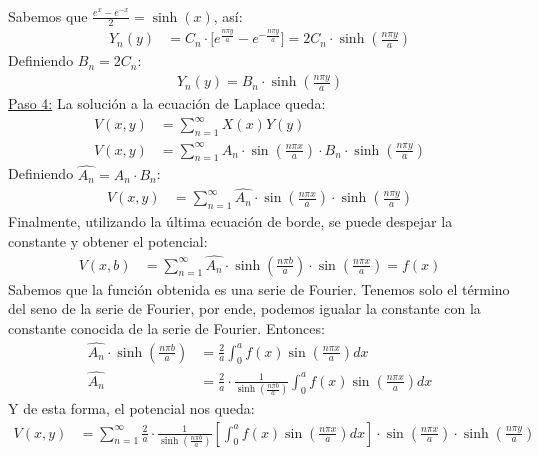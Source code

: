 \documentclass[
  11pt,
  letterpaper,
   answers
  ]{exam}
\begin{document}
\begin{questions}
\begin{solution}
\begin{parts}
\begin{align}
        \end{align}
        Sabemos que $\frac{e^{x} - e^{-x}}{2} = \sinh{(x)}$, así:
        \begin{align}
            Y_n(y) &= C_n \cdot \bigl[e^{\frac{n \pi y}{a}} - e^{-\frac{n \pi y}{a}}\bigr] = 2 C_n \cdot \sinh\!\left(\frac{n \pi y}{a}\right)
        \end{align}
        Definiendo $B_n = 2C_n$:
        \begin{align}
            Y_n(y) = B_n \cdot \sinh\!\left(\frac{n \pi y}{a}\right)
        \end{align}
    \underline{Paso 4:} La solución a la ecuación de Laplace queda:
    \begin{align}
    V(x,y) &= \sum_{n=1}^{\infty} X(x) Y(y) \\ 
    V(x,y) &= \sum_{n=1}^{\infty} A_n \cdot \sin\!\left(\frac{n \pi x}{a}\right) \cdot B_n \cdot \sinh\!\left(\frac{n \pi y}{a}\right)
    \end{align}
    Definiendo $\hat{A_n} = A_n \cdot B_n$:
    \begin{align}
    V(x,y) &= \sum_{n=1}^{\infty} \hat{A_n} \cdot \sin\!\left(\frac{n \pi x}{a}\right) \cdot \sinh\!\left(\frac{n \pi y}{a}\right)
    \end{align}
    Finalmente, utilizando la última ecuación de borde, se puede despejar la constante y obtener el potencial:
    \begin{align}
    V(x,b) &= \sum_{n=1}^{\infty} \hat{A_n} \cdot \sinh\!\left(\frac{n \pi b}{a}\right) \cdot \sin\!\left(\frac{n \pi x}{a}\right) = f(x)
    \end{align}
    Sabemos que la función obtenida es una serie de Fourier. Tenemos solo el término del seno de la serie de Fourier, por ende, podemos igualar la constante con la constante conocida de la serie de Fourier. Entonces:
    \begin{align}
    \hat{A_n} \cdot \sinh\!\left(\frac{n \pi b}{a}\right) &= \frac{2}{a} \int_{0}^{a} f(x) \sin\!\left(\frac{n \pi x}{a}\right) dx \\
    \hat{A_n} &= \frac{2}{a} \cdot \frac{1}{\sinh\!\left(\frac{n \pi b}{a}\right)}\int_{0}^{a} f(x) \sin\!\left(\frac{n \pi x}{a}\right) dx
    \end{align}
    Y de esta forma, el potencial nos queda:
    \begin{align}
    V(x,y) &= \sum_{n=1}^{\infty} \frac{2}{a} \cdot \frac{1}{\sinh\!\left(\frac{n \pi b}{a}\right)} \left[\int_{0}^{a} f(x) \sin\!\left(\frac{n \pi x}{a}\right) dx\right] \cdot \sin\!\left(\frac{n \pi x}{a}\right) \cdot \sinh\!\left(\frac{n \pi y}{a}\right)
    \end{align}


\end{parts}
\end{solution}
\end{questions}
\end{document}
